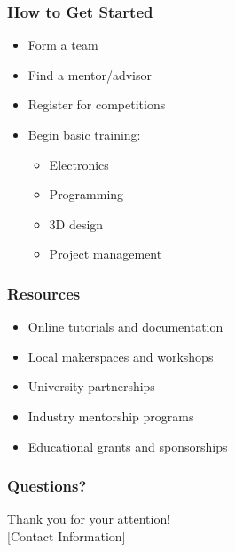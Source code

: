 \documentclass{beamer}
\begin{document}
\begin{frame}
\frametitle{How to Get Started}
\begin{itemize}
\item Form a team
\item Find a mentor/advisor
\item Register for competitions
\item Begin basic training:
    \begin{itemize}
    \item Electronics
    \item Programming
    \item 3D design
    \item Project management
    \end{itemize}
\end{itemize}
\end{frame}

\begin{frame}
\frametitle{Resources}
\begin{itemize}
\item Online tutorials and documentation
\item Local makerspaces and workshops
\item University partnerships
\item Industry mentorship programs
\item Educational grants and sponsorships
\end{itemize}
\end{frame}

\begin{frame}
\frametitle{Questions?}
\begin{center}
Thank you for your attention!\\
\vspace{1cm}
[Contact Information]
\end{center}
\end{frame}
\end{document}
